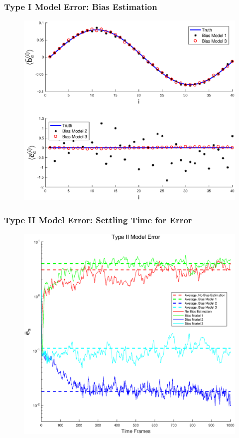 \documentclass{beamer}
\begin{document}
\begin{frame}
\frametitle{Type I Model Error: Bias Estimation}
\begin{figure} 
\centering
\includegraphics[scale=0.4]{Figures/BiasEstM1}
\end{figure}
\end{frame}

\begin{frame}
\frametitle{Type II Model Error: Settling Time for Error}
\begin{figure} 
\centering
\includegraphics[scale=0.4]{Figures/ErrVsTimeM2_1}
\end{figure}
\end{frame}
\end{document}
